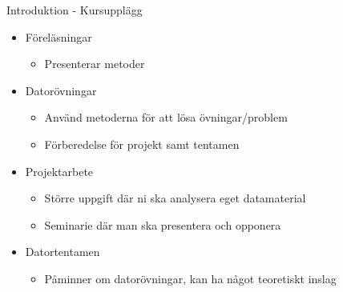 \documentclass[10pt,english]{beamer}
\begin{document}
\begin{frame}{Introduktion - Kursupplägg}
    \begin{itemize}
        \item Föreläsningar
        \begin{itemize}
            \item Presenterar metoder
        \end{itemize}
        \item Datorövningar
        \begin{itemize}
            \item Använd metoderna för att lösa övningar/problem
            \item Förberedelse för projekt samt tentamen
        \end{itemize}
        \item Projektarbete
        \begin{itemize}
            \item Större uppgift där ni ska analysera eget datamaterial
            \item Seminarie där man ska presentera och opponera
        \end{itemize}
        \item Datortentamen
        \begin{itemize}
            \item Påminner om datorövningar, kan ha något teoretiskt inslag
        \end{itemize}
    \end{itemize}
    
\end{frame}
\end{document}
